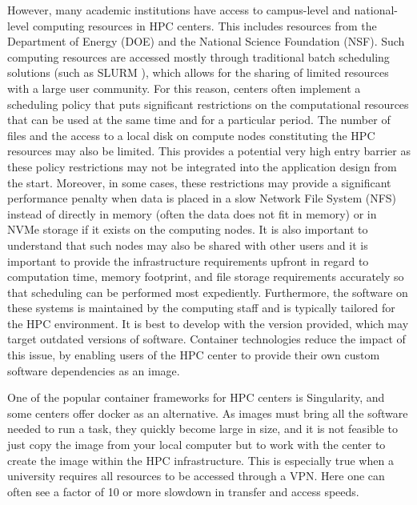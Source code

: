 \documentclass[utf8]{FrontiersinVancouver} %
\begin{document}
However, many academic institutions have access to campus-level and
national-level computing resources in HPC centers.  This includes
resources from the Department of Energy (DOE) and the National Science
Foundation (NSF). Such computing resources are accessed mostly through
traditional batch scheduling solutions (such as SLURM
\citep{www-slurm}), which allows for the sharing of limited resources
with a large user community. For this reason, centers often implement
a scheduling policy that puts significant restrictions on the
computational resources that can be used at the same time and for
a particular period. The number of files and the access to a local
disk on compute nodes constituting the HPC resources may also be
limited.  This provides a potential very high entry barrier as these
policy restrictions may not be integrated into the application design
from the start.  Moreover, in some cases, these restrictions may
provide a significant performance penalty when data is placed in a
slow Network File System (NFS) instead of directly in memory (often
the data does not fit in memory) or in NVMe storage if it exists on
the computing nodes.  It is also important to understand that such
nodes may also be shared with other users and it is important to
provide the infrastructure requirements upfront in regard to
computation time, memory footprint, and file storage requirements
accurately so that scheduling can be performed most expediently.
Furthermore, the software on these systems is maintained by the
computing staff and is typically tailored for the HPC environment.  It
is best to develop with the version provided, which may target
outdated versions of software.  Container technologies reduce the
impact of this issue, by enabling users of the HPC center to provide
their own custom software dependencies as an image.
 

One of the popular container frameworks for HPC centers is
Singularity, and some centers offer docker as an alternative. As images must bring
all the software needed to run a task, they quickly become large in
size, and it is not feasible to just copy the image from your local
computer but to work with the center to create the image within the
HPC infrastructure. This is especially true when a university
requires all resources to be accessed through a VPN. Here one can
often see a factor of 10 or more slowdown in transfer and access
speeds.
\end{document}

